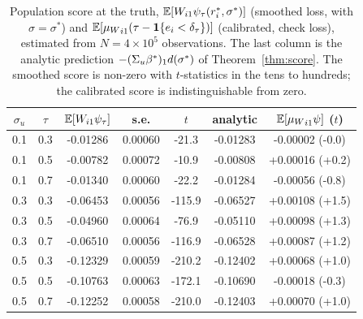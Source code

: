 \begin{table}[ht]
\centering
\small
\caption{Population score at the truth, $\mathbb{E}[W_{i1}\psi_\tau(r_i^*,\sigma^*)]$ (smoothed loss, with $\sigma=\sigma^*$) and $\mathbb{E}[{\mu_W}_{i1}(\tau-\mathbf{1}\{e_i<\delta_\tau\})]$ (calibrated, check loss), estimated from $N=4\times10^5$ observations. The last column is the analytic prediction $-(\Sigma_u\beta^*)_1 d(\sigma^*)$ of Theorem~\ref{thm:score}. The smoothed score is non-zero with $t$-statistics in the tens to hundreds; the calibrated score is indistinguishable from zero.}
\label{tab:score}
\begin{tabular}{ccccccc}
\toprule
$\sigma_u$ & $\tau$ & $\mathbb{E}[W_{i1}\psi_\tau]$ & s.e. & $t$ & analytic & $\mathbb{E}[{\mu_W}_{i1}\psi]$ ($t$) \\
\midrule
0.1 & 0.3 & -0.01286 & 0.00060 & -21.3 & -0.01283 & -0.00002 (-0.0) \\
0.1 & 0.5 & -0.00782 & 0.00072 & -10.9 & -0.00808 & +0.00016 (+0.2) \\
0.1 & 0.7 & -0.01340 & 0.00060 & -22.2 & -0.01284 & -0.00056 (-0.8) \\
0.3 & 0.3 & -0.06453 & 0.00056 & -115.9 & -0.06527 & +0.00108 (+1.5) \\
0.3 & 0.5 & -0.04960 & 0.00064 & -76.9 & -0.05110 & +0.00098 (+1.3) \\
0.3 & 0.7 & -0.06510 & 0.00056 & -116.9 & -0.06528 & +0.00087 (+1.2) \\
0.5 & 0.3 & -0.12329 & 0.00059 & -210.2 & -0.12402 & +0.00068 (+1.0) \\
0.5 & 0.5 & -0.10763 & 0.00063 & -172.1 & -0.10690 & -0.00018 (-0.3) \\
0.5 & 0.7 & -0.12252 & 0.00058 & -210.0 & -0.12403 & +0.00070 (+1.0) \\
\bottomrule
\end{tabular}
\end{table}
